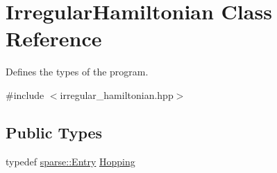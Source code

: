 \hypertarget{classIrregularHamiltonian}{\section{Irregular\+Hamiltonian Class Reference}
\label{classIrregularHamiltonian}
}


Defines the types of the program.  




{\ttfamily \#include $<$irregular\+\_\+hamiltonian.\+hpp$>$}

\subsection*{Public Types}
\begin{DoxyCompactItemize}
\item 
typedef \hyperlink{namespacesparse_a841919761b2e35cc4d59f636ab10a07b}{sparse\+::\+Entry} \hyperlink{classIrregularHamiltonian_ac7037c4beb0bd21bfa728132c3235b61}{Hopping}
\end{DoxyCompactItemize}
